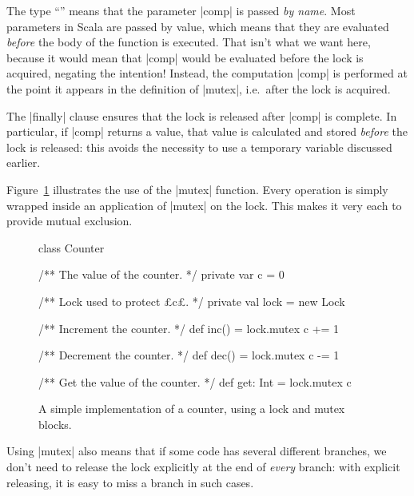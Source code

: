 The type ``'' means that the parameter |comp| is passed \emph{by
  name}.  Most parameters in Scala are passed by value, which means
that they are evaluated \emph{before} the body of the function is executed.
That isn't what we want here, because it would mean that |comp| would be
evaluated before the lock is acquired, negating the intention!  Instead, the
computation |comp| is performed at the point it appears in the definition of
|mutex|, i.e.~after the lock is acquired.

The |finally| clause ensures that the lock is released after |comp| is
complete.  In particular, if |comp| returns a value, that value is calculated
and stored \emph{before} the lock is released: this avoids the necessity to
use a temporary variable discussed earlier.

Figure~\ref{fig:counter-lock} illustrates the use of the |mutex| function.
Every operation is simply wrapped inside an application of |mutex| on the
lock.  This makes it very each to provide mutual exclusion.  


\begin{figure}
\begin{scala}
class Counter{
  /** The value of the counter. */
  private var c = 0

  /** Lock used to protect £c£. */
  private val lock = new Lock

  /** Increment the counter. */
  def inc() = lock.mutex{ c += 1 }

  /** Decrement the counter. */
  def dec() = lock.mutex{ c -= 1 }

  /** Get the value of the counter. */
  def get: Int = lock.mutex{ c}
}
\end{scala}
\caption{A simple implementation of a counter, using a lock and {\scalashape
    mutex} blocks.}
\label{fig:counter-lock}
\end{figure}


Using |mutex| also means that if some code has several different branches, we
don't need to release the lock explicitly at the end of \emph{every} branch:
with explicit releasing, it is easy to miss a branch in such cases. 



